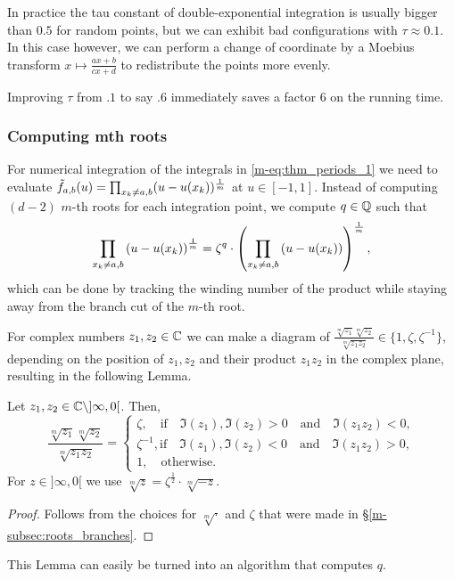 \documentclass[main.tex]{subfiles}
\begin{document}
   In practice the tau constant of double-exponential integration is usually bigger than $0.5$
   for random points, but we can exhibit bad configurations with $τ\approx 0.1$. In this case
   however, we can perform a change of coordinate by a Moebius transform
   $x\mapsto \frac{ax+b}{cx+d}$ to redistribute the points more evenly.

   Improving $τ$ from $.1$ to say $.6$ immediately saves a factor $6$ on the running time.

  \subsubsection{Computing mth roots}

  For numerical integration of the integrals in \eqref{m-eq:thm_periods_1}
  we need to evaluate $\tilde{f}_{a,b}(u) = \prod_{x_k \ne a,b} (u-u(x_k))^{\frac{1}{m}}$ at $u
  \in [-1,1]$. Instead of computing $(d-2)$ $m$-th roots for each
  integration point, we compute $q \in \mathbb{Q}$ such that $$\prod_{x_k \ne a,b}
  \left(u - u(x_k) \right)^{\frac{1}{m}} = \zeta^q \cdot \left( \prod_{x_k \ne a,b}
  \left( u - u(x_k) \right) \right)^{\frac{1}{m}} ,$$ which can be done by tracking
  the winding number of the product while staying away from the branch cut
  of the $m$-th root.

  For complex numbers $z_1,z_2 \in \mathbb{C}$ we can make a diagram of
  $\frac{\sqrt[m]{z_1}\sqrt[m]{z_2}}{\sqrt[m]{z_1z_2}} \in \{ 1, \zeta,
  \zeta^{-1} \}$, depending on the position of $z_1,z_2$ and their product
  $z_1z_2$ in the complex plane, resulting in the following Lemma.

  \begin{lemma}\label{lemma:wind_numb}
  Let $z_1,z_2 \in \mathbb{C}  \setminus  ]\infty,0[$. Then,
  $$\frac{\sqrt[m]{z_1}\sqrt[m]{z_2}}{\sqrt[m]{z_1z_2}} = \begin{cases}
                                                           \zeta, \quad \text{if} \quad \Im(z_1), \Im(z_2) > 0 \quad \text{and} \quad \Im(z_1z_2) < 0 , \\
                                                           \zeta^{-1}, \text{if} \quad \Im(z_1), \Im(z_2) < 0 \quad \text{and} \quad \Im(z_1z_2) > 0 , \\
                                                           1, \quad \text{otherwise}.
                                                         \end{cases}$$
   For $z \in ]\infty,0[$ we use $\sqrt[m]{z} = \zeta^{\frac{1}{2}} \cdot \sqrt[m]{-z}$.
  \end{lemma}
  \begin{proof}
   Follows from the choices for $\sqrt[m]{\cdot}$ and $\zeta$ that were made in \S \ref{m-subsec:roots_branches}.
  \end{proof}
   This Lemma can easily be turned into an algorithm that computes $q$.
\end{document}
